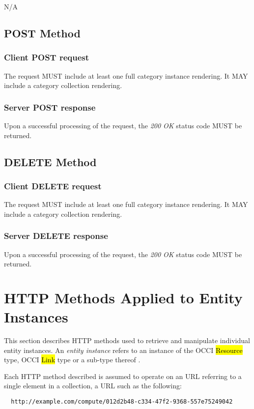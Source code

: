 \documentclass[10pt,a4paper]{article}
\begin{document}
N/A

\subsection{POST Method}

\subsubsection*{Client POST request}
The request MUST include at least one full category instance rendering. It MAY include a category collection rendering.

\subsubsection*{Server POST response}
Upon a successful processing of the request, the \emph{200 OK} status code MUST be returned.

\subsection{DELETE Method}

\subsubsection*{Client DELETE request}
The request MUST include at least one full category instance rendering. It MAY include a category collection rendering.

\subsubsection*{Server DELETE response}
Upon a successful processing of the request, the \emph{200 OK} status code MUST be returned.

\section{HTTP Methods Applied to Entity Instances}
\label{sec:http_methods_ei}

This section describes HTTP methods used to retrieve and manipulate
individual entity instances. An {\em entity instance} refers to an instance
of the OCCI \hl{Resource} type, OCCI \hl{Link} type or a sub-type thereof
\cite{occi:core}.

Each HTTP method described is assumed to operate on an URL referring to
a single element in a collection, a URL such as the following:
\begin{verbatim}
  http://example.com/compute/012d2b48-c334-47f2-9368-557e75249042
\end{verbatim}
\end{document}
